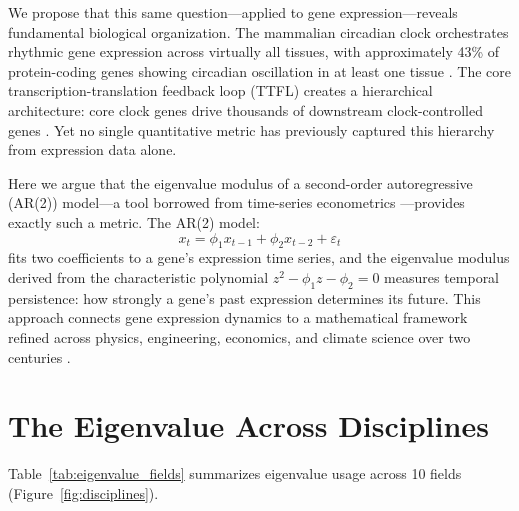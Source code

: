 \documentclass[11pt,letterpaper]{article}
\begin{document}
We propose that this same question---applied to gene expression---reveals fundamental biological organization. The mammalian circadian clock orchestrates rhythmic gene expression across virtually all tissues, with approximately 43\% of protein-coding genes showing circadian oscillation in at least one tissue \citep{zhang2014circadian}. The core transcription-translation feedback loop (TTFL) creates a hierarchical architecture: core clock genes drive thousands of downstream clock-controlled genes \citep{takahashi2017transcriptional}. Yet no single quantitative metric has previously captured this hierarchy from expression data alone.

Here we argue that the eigenvalue modulus of a second-order autoregressive (AR(2)) model---a tool borrowed from time-series econometrics \citep{hamilton1994time, granger1969investigating}---provides exactly such a metric. The AR(2) model:
\begin{equation}
x_t = \phi_1 x_{t-1} + \phi_2 x_{t-2} + \varepsilon_t
\end{equation}
fits two coefficients to a gene's expression time series, and the eigenvalue modulus derived from the characteristic polynomial $z^2 - \phi_1 z - \phi_2 = 0$ measures temporal persistence: how strongly a gene's past expression determines its future. This approach connects gene expression dynamics to a mathematical framework refined across physics, engineering, economics, and climate science over two centuries \citep{strogatz2001nonlinear}.

\section{The Eigenvalue Across Disciplines}

Table~\ref{tab:eigenvalue_fields} summarizes eigenvalue usage across 10 fields (Figure~\ref{fig:disciplines}).
\end{document}
